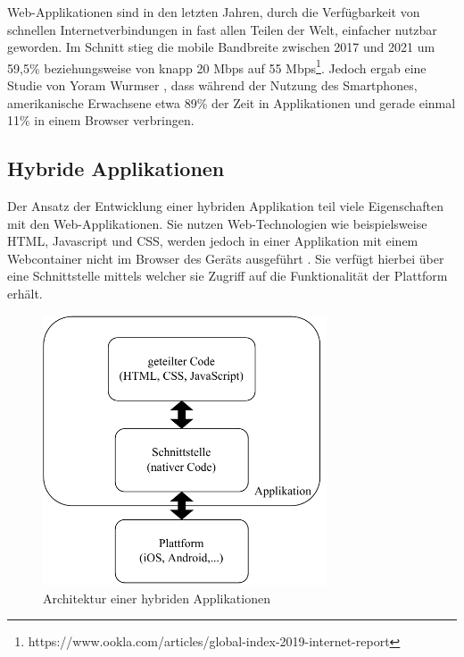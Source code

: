 Web-Applikationen sind in den letzten Jahren, durch die Verfügbarkeit von schnellen Internetverbindungen in fast allen Teilen der Welt, einfacher nutzbar geworden.
Im Schnitt stieg die mobile Bandbreite zwischen 2017 und 2021 um 59,5\% beziehungsweise von knapp 20 Mbps auf 55 Mbps\footnote{https://www.ookla.com/articles/global-index-2019-internet-report}.
Jedoch ergab eine Studie von Yoram Wurmser \cite{report_webusage}, dass während der Nutzung des Smartphones, amerikanische Erwachsene etwa 89\% der Zeit in Applikationen und gerade einmal 11\% in einem Browser verbringen.

\subsection{Hybride Applikationen}
\label{cha:3_hybrid}
Der Ansatz der Entwicklung einer hybriden Applikation teil viele Eigenschaften mit den Web-Applikationen.
Sie nutzen Web-Technologien wie beispielsweise HTML, Javascript und CSS, werden jedoch in einer Applikation mit einem Webcontainer nicht im Browser des Geräts ausgeführt \cite{IEEE_development_classes}.
Sie verfügt hierbei über eine Schnittstelle mittels welcher sie Zugriff auf die Funktionalität der Plattform erhält.

\begin{figure}[ht]
  \centering
  \includegraphics[height=8cm,keepaspectratio]{images/hybrid_architecture.drawio.pdf} 
  \caption{Architektur einer hybriden Applikationen}
  \label{fig:hybrid_architecture}
\end{figure}

